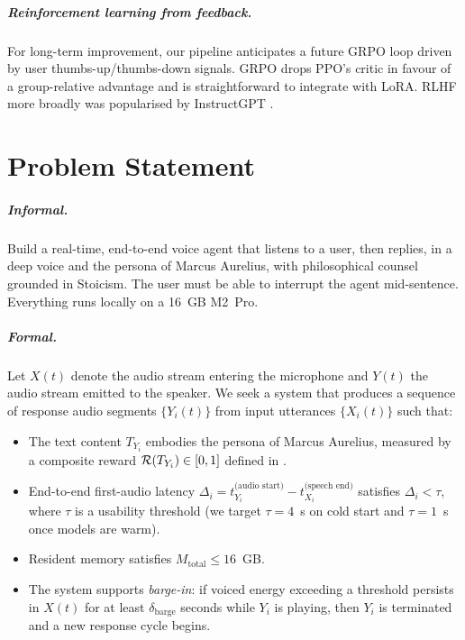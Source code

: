 \documentclass{ecsproject}
\begin{document}
\paragraph{Reinforcement learning from feedback.}
For long-term improvement, our pipeline anticipates a future GRPO
\citep{shao2024deepseekmath} loop driven by user thumbs-up/thumbs-down
signals. GRPO drops PPO's critic in favour of a group-relative
advantage and is straightforward to integrate with LoRA. RLHF more
broadly was popularised by InstructGPT \citep{ouyang2022instruct}.

\chapter{Problem Statement} \label{Chapter:Problem}

\paragraph{Informal.}
Build a real-time, end-to-end voice agent that listens to a user, then
replies, in a deep voice and the persona of Marcus Aurelius, with
philosophical counsel grounded in Stoicism. The user must be able to
interrupt the agent mid-sentence. Everything runs locally on a
16~GB M2~Pro.

\paragraph{Formal.}
Let $X(t)$ denote the audio stream entering the microphone and $Y(t)$
the audio stream emitted to the speaker. We seek a system that
produces a sequence of response audio segments $\{Y_i(t)\}$ from
input utterances $\{X_i(t)\}$ such that:
\begin{itemize}
    \item The text content $T_{Y_i}$ embodies the persona of Marcus
    Aurelius, measured by a composite reward
    $\mathcal{R}(T_{Y_i}) \in [0, 1]$ defined in .
    \item End-to-end first-audio latency
    $\Delta_i = t^{\text{(audio start)}}_{Y_i} -
                t^{\text{(speech end)}}_{X_i}$
    satisfies $\Delta_i < \tau$, where $\tau$ is a usability threshold
    (we target $\tau = 4$~s on cold start and $\tau = 1$~s once
    models are warm).
    \item Resident memory satisfies $M_{\text{total}} \leq 16$~GB.
    \item The system supports \emph{barge-in}: if voiced energy
    exceeding a threshold persists in $X(t)$ for at least
    $\delta_{\text{barge}}$ seconds while $Y_i$ is playing, then $Y_i$
    is terminated and a new response cycle begins.
\end{itemize}
\end{document}

